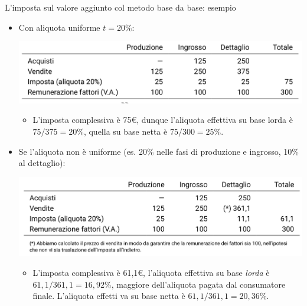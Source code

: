 \documentclass[11pt,italian]{beamer}
\begin{document}
\begin{frame}{L'imposta sul valore aggiunto col metodo base da base: esempio}
\begin{itemize}
\item Con aliquota uniforme $t=20\%$:
\begin{center}
\includegraphics[width=.8\textwidth]{./figure/esempio-base-da-base-aliquota-uniforme.png}
\end{center}
\begin{itemize}
\item L'imposta complessiva è 75€, dunque l'aliquota effettiva su base lorda è
$75/375=20\%$, quella su base netta è $75/300=25\%$.
\end{itemize}

\item Se l'aliquota non è uniforme (es. 20\% nelle fasi di produzione e ingrosso,
10\% al dettaglio):
\begin{center}
\includegraphics[width=.8\textwidth]{./figure/esempio-base-da-base-aliquota-differenziata.png}
\end{center}
\begin{itemize}
\item L'imposta complessiva è 61,1€, l'aliquota effettiva su base \emph{lorda} è
$61,1/361,1=16,92\%$, maggiore dell'aliquota pagata dal consumatore
finale. L'aliquota effetti va su base netta è $61,1/361,1=20,36\%$.
\end{itemize}
\end{itemize}
\end{frame}
\end{document}
